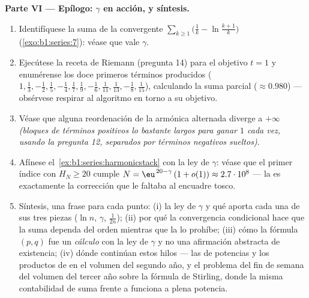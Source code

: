 \begin{problem}[{Problema del fin de semana --- $H_n = \ln n + \gamma +
\frac{1}{2n} + O(n^{-2})$, y la reordenación de
$1 - \frac12 + \frac13 - \dots$ hasta $\frac{\ln 2}{2}$}]
\medskip
\noindent\textbf{Parte VI --- Epílogo: $\gamma$ en acción, y
síntesis.}
\begin{enumerate}[resume]
  \item Identifíquese la suma de la  convergente
        $\sum_{k\geq1} \bigl(\frac1k - \ln\frac{k+1}{k}\bigr)$
        (\cref{exo:b1:series:7}): véase que vale $\gamma$.
  \item Ejecútese la receta de Riemann (pregunta 14) para el
        objetivo $t = 1$ y enumérense los doce primeros términos
        producidos ($1, \frac13, -\frac12, \frac15, -\frac14,
        \frac17, \frac19, -\frac16, \frac1{11}, \frac1{13},
        -\frac18, \frac1{15}$), calculando la suma parcial
        ($\approx 0.980$) --- obsérvese respirar al algoritmo en
        torno a su objetivo.
  \item Véase que alguna reordenación de la  armónica alternada
        diverge a $+\infty$ \emph{(bloques de términos positivos lo
        bastante largos para ganar $1$ cada vez, usando la
        pregunta 12, separados por términos negativos sueltos)}.
  \item Afínese el~\cref{ex:b1:series:harmonicstack} con la ley de
        $\gamma$: véase que el primer índice con $H_N \geq 20$
        cumple $N = \eu^{\,20 - \gamma}\,(1 + o(1)) \approx
        2.7\cdot10^{8}$ --- la  es exactamente la
        corrección que le faltaba al encuadre tosco.
  \item Síntesis, una frase para cada punto: (i) la ley de $\gamma$
        y qué aporta cada una de sus tres piezas ($\ln n$, $\gamma$,
        $\frac{1}{2n}$); (ii) por qué la convergencia condicional
        hace que la suma dependa del orden mientras que la
         lo prohíbe; (iii) cómo la fórmula
        $(p,q)$ fue un \emph{cálculo} con la ley de $\gamma$ y no
        una afirmación abstracta de existencia; (iv) dónde
        continúan estos hilos --- las  de potencias y los
        productos de  en el volumen del segundo año, y el
        problema del fin de semana del volumen del tercer año sobre
        la fórmula de Stirling, donde la misma contabilidad de suma
        frente a  funciona a plena potencia.
\end{enumerate}
\end{problem}
